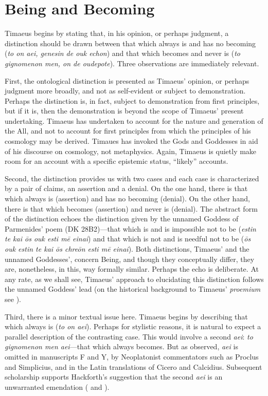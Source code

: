 
\section{Being and Becoming} %
\label{sec:Being and Becoming}

Timaeus begins by stating that, in his opinion, or perhaps judgment, a distinction should be drawn between that which always is and has no becoming (\emph{to on aei, genesin de ouk echon}) and that which becomes and never is (\emph{to gignomenon men, on de oudepote}). Three observations are immediately relevant. 

First, the ontological distinction is presented as Timaeus' opinion, or perhaps judgment more broadly, and not as self-evident or subject to demonstration. Perhaps the distinction is, in fact, subject to demonstration from first principles, but if it is, then the demonstration is beyond the scope of Timaeus' present undertaking. Timaeus has undertaken to account for the nature and generation of the All, and not to account for first principles from which the principles of his cosmology may be derived. Timaues has invoked the Gods and Goddesses in aid of his discourse on cosmology, not metaphysics. Again, Timaeus is quietly make room for an account with a specific epistemic status, ``likely'' accounts.

Second, the distinction provides us with two cases and each case is characterized by a pair of claims, an assertion and a denial. On the one hand, there is that which always is (assertion) and has no becoming (denial). On the other hand, there is that which becomes (assertion) and never is (denial). The abstract form of the distinction echoes the distinction given by the unnamed Goddess of Parmenides' poem (DK 28B2)---that which is and is impossible not to be (\emph{estin te kai ōs ouk esti mē einai}) and that which is not and is needful not to be (\emph{ōs ouk estin te kai ōs chreōn esti mē einai}). Both distinctions, Timaeus' and the unnamed Goddesses', concern Being, and though they conceptually differ, they are, nonetheless, in this, way formally similar. Perhaps the echo is deliberate. At any rate, as we shall see, Timaeus' approach to elucidating this distinction follows the unnamed Goddess' lead (on the historical background to Timaeus' \emph{proemium} see \citealt{Runia:1997vz}).

Third, there is a minor textual issue here. Timaeus begins by describing that which always is (\emph{to on aei}). Perhaps for stylistic reasons, it is natural to expect a parallel description of the contrasting case. This would involve a second \emph{aei}: \emph{to gignomenon men aei}---that which always becomes. But as \citet{Hackforth:1959dj} observed, \emph{aei} is omitted in manuscripts F and Y, by Neoplatonist commentators such as Proclus and Simplicius, and in the Latin translations of Cicero and Calcidius. Subsequent scholarship supports Hackforth's suggestion that the second \emph{aei} is an unwarranted emendation (\citealt{Whittaker:1969mq,Whittaker:1973nz} and \citealt{Dillon:1989hc}). 

